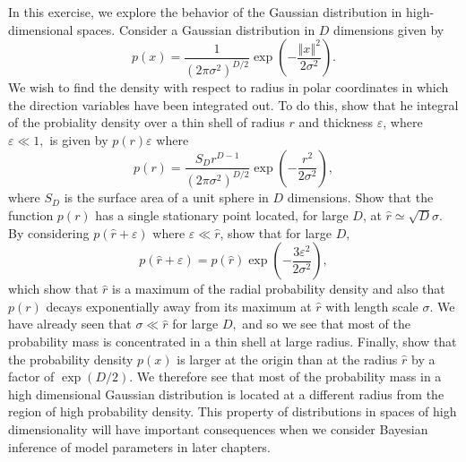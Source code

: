 \begin{cBoxA}{}
 In this exercise, we explore the behavior of the Gaussian distribution
in high-dimensional spaces. Consider a Gaussian distribution in $D$
dimensions given by 
\[
p(x)=\frac{1}{(2\pi\sigma^{2})^{D/2}}\exp\left(-\frac{\left\Vert x\right\Vert ^{2}}{2\sigma^{2}}\right).
\]
We wish to find the density with respect to radius in polar coordinates
in which the direction variables have been integrated out. To do this,
show that he integral of the probiality density over a thin shell
of radius $r$ and thickness $\varepsilon$, where $\varepsilon\ll1,$
is given by $p(r)\varepsilon$ where 
\[
p(r)=\frac{S_{D}r^{D-1}}{(2\pi\sigma^{2})^{D/2}}\exp\left(-\frac{r^{2}}{2\sigma^{2}}\right),
\]
where $S_{D}$ is the surface area of a unit sphere in $D$ dimensions.
Show that the function $p(r)$ has a single stationary point located,
for large $D$, at $\widehat{r}\simeq\sqrt{D}\sigma.$ By considering
$p(\widehat{r}+\varepsilon)$ where $\varepsilon\ll\widehat{r}$,
show that for large $D,$
\[
p(\widehat{r}+\varepsilon)=p(\widehat{r})\exp\left(-\frac{3\varepsilon^{2}}{2\sigma^{2}}\right),
\]
which show that $\widehat{r}$ is a maximum of the radial probability
density and also that $p(r)$ decays exponentially away from its maximum
at $\widehat{r}$ with length scale $\sigma$. We have already seen
that $\sigma\ll\widehat{r}$ for large $D,$ and so we see that most
of the probability mass is concentrated in a thin shell at large radius.
Finally, show that the probability density $p(x)$ is larger at the
origin than at the radius $\widehat{r}$ by a factor of $\exp(D/2).$
We therefore see that most of the probability mass in a high dimensional
Gaussian distribution is located at a different radius from the region
of high probability density. This property of distributions in spaces
of high dimensionality will have important consequences when we consider
Bayesian inference of model parameters in later chapters. 
\end{cBoxA}

